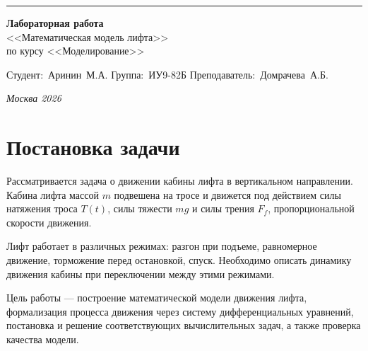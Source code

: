 \documentclass[a4paper, 14pt]{extarticle}
\begin{document}
\begin{titlepage}
\vspace*{-16pt}
\hspace{30pt}\rule{0.866\textwidth}{0.4pt}

\vspace{11em}

\begin{center}
\Large {\bf Лабораторная работа} \\ 
\large <<Математическая модель лифта>> \\
\large {по курсу <<Моделирование>>} \\

\end{center}\normalsize

\vspace{8em}

\vbox{%
\hfill%
\vbox{%
\hbox{Студент: Аринин М.А.}%
\hbox{Группа: ИУ9-82Б}%
\hbox{Преподаватель: Домрачева А.Б.}%
}%
} 

\bigskip

\vfill


\begin{center}
\textsl{Москва 2026}
\end{center}
\end{titlepage}


\renewcommand{\ttdefault}{pcr}

\setlength{\tabcolsep}{3pt}

\newpage
\setcounter{page}{2}

\section{Постановка задачи}
Рассматривается задача о движении кабины лифта в вертикальном направлении. Кабина лифта массой $m$ подвешена на тросе и движется под действием силы натяжения троса $T(t)$, силы тяжести $mg$ и силы трения $F_f$, пропорциональной скорости движения.

Лифт работает в различных режимах: разгон при подъеме, равномерное движение, торможение перед остановкой, спуск. Необходимо описать динамику движения кабины при переключении между этими режимами.

Цель работы --- построение математической модели движения лифта, формализация процесса движения через систему дифференциальных уравнений, постановка и решение соответствующих вычислительных задач, а также проверка качества модели.

\end{document}
